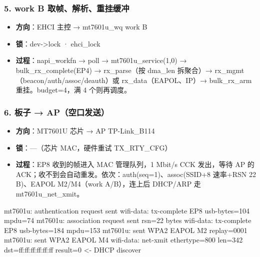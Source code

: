 \documentclass[UTF8,zihao=-4,fontset=none]{ctexart}
\begin{document}
\subsubsection*{5. work B 取帧、解析、重挂缓冲}
\begin{itemize}[leftmargin=2em,itemsep=1pt]
\item \textbf{方向}：EHCI 主控 → mt7601u\_wq work B
\item \textbf{锁}：dev->lock · ehci\_lock
\item \textbf{过程}：napi\_workfn → poll → mt7601u\_service(1,0) → bulk\_rx\_complete(EP4) → rx\_parse（按 dma\_len 拆聚合）→ rx\_mgmt（beacon/auth/assoc/deauth）或 rx\_data（EAPOL、IP）→ bulk\_rx\_arm 重挂。budget=4，满 4 个则再调度。
\end{itemize}

\subsubsection*{6. 板子 → AP（空口发送）}
\begin{itemize}[leftmargin=2em,itemsep=1pt]
\item \textbf{方向}：MT7601U 芯片 → AP TP-Link\_B114
\item \textbf{锁}：—（芯片 MAC，硬件重试 TX\_RTY\_CFG）
\item \textbf{过程}：EP8 收到的帧进入 MAC 管理队列，1 Mbit/s CCK 发出，等待 AP 的 ACK；收不到会自动重发。依次：auth(seq=1)、assoc(SSID+8 速率+RSN 22 B)、EAPOL M2/M4（work A/B），连上后 DHCP/ARP 走 mt7601u\_net\_xmit。
\end{itemize}
\begin{logv}
mt7601u: authentication request sent
wifi-data: tx-complete EP8 usb-bytes=104 mpdu=74
mt7601u: association request sent rsn=22 bytes
wifi-data: tx-complete EP8 usb-bytes=184 mpdu=153
mt7601u: sent WPA2 EAPOL M2 replay=0001
mt7601u: sent WPA2 EAPOL M4
wifi-data: net-xmit ethertype=800 len=342 dst=ff:ff:ff:ff:ff:ff result=0   <- DHCP discover
\end{logv}
\end{document}
